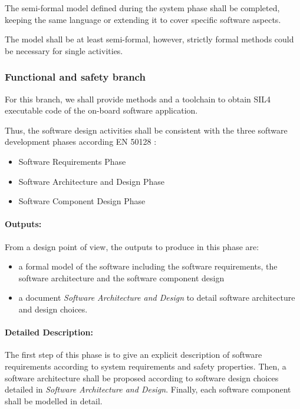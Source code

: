 The semi-formal model defined during the system phase shall be completed, keeping the same language or extending it to  cover specific software aspects.

The model  shall be at least semi-formal, however, strictly  formal  methods could be necessary for single activities.

\subsubsection{Functional and safety branch}

For this branch, we shall provide methods and a toolchain to  obtain SIL4 executable code of the on-board software application. 

Thus, the software design activities shall be consistent with the three software development phases according EN 50128 :

\begin{itemize}
\item Software Requirements Phase
\item Software Architecture and Design Phase
\item Software Component Design Phase
\end{itemize}

\paragraph{Outputs:}
\label{sec:sw-req-documents}
From a design point of view, the outputs to produce in this phase are:

\begin{itemize}
\item a formal model of the software including the software requirements, the software architecture and the software component design
\item  a document  \textit{Software Architecture and Design} to  detail software architecture and design choices.
\end{itemize}


\paragraph{Detailed Description:}
\label{sec:sw-req-deta-descr}

The first step of this phase is to give an explicit description of software requirements according to system requirements and safety properties.  Then, a software architecture shall be proposed according to software design choices detailed in  \textit{Software Architecture and Design}.
Finally, each software component shall be modelled in detail.

